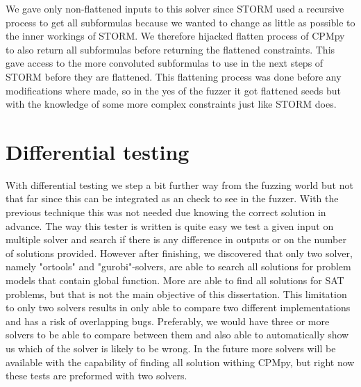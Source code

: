 We gave only non-flattened inputs to this solver since STORM used a recursive process to get all subformulas because we wanted to change as little as possible to the inner workings of STORM. We therefore hijacked flatten process of CPMpy to also return all subformulas before returning the flattened constraints. This gave access to the more convoluted subformulas to use in the next steps of STORM before they are flattened. This flattening process was done before any modifications where made, so in the yes of the fuzzer it got flattened seeds but with the knowledge of some more complex constraints just like STORM does.



%

\section{Differential testing}
With differential testing we step a bit further way from the fuzzing world but not that far since this can be integrated as an check to see in the fuzzer. With the previous technique this was not needed due knowing the correct solution in advance. The way this tester is written is quite easy we test a given input on multiple solver and search if there is any difference in outputs or on the number of solutions provided.
However after finishing, we discovered that only two solver, namely "ortools" and "gurobi"-solvers, are able to search all solutions for problem models that contain global function. More are able to find all solutions for SAT problems, but that is not the main objective of this dissertation. This limitation to only two solvers results in only able to compare two different implementations and has a risk of overlapping bugs. Preferably, we would have three or more solvers to be able to compare between them and also able to automatically show us which of the solver is likely to be wrong. In the future more solvers will be available with the capability of finding all solution withing CPMpy, but right now these tests are preformed with two solvers. 

